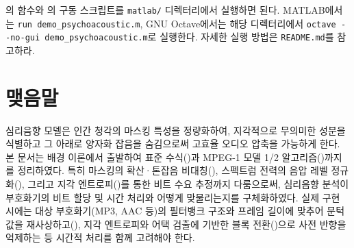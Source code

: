 \documentclass[11pt,a4paper]{article}
\begin{document}
의 함수와 의 구동 스크립트를
\texttt{matlab/} 디렉터리에서 실행하면 된다. MATLAB에서는
\texttt{run demo\_psychoacoustic.m}, GNU Octave에서는 해당 디렉터리에서
\texttt{octave -{}-no-gui demo\_psychoacoustic.m}로 실행한다. 자세한 실행 방법은
\texttt{README.md}를 참고하라.

\section{맺음말}
심리음향 모델은 인간 청각의 마스킹 특성을 정량화하여, 지각적으로 무의미한 성분을
식별하고 그 아래로 양자화 잡음을 숨김으로써 고효율 오디오 압축을 가능하게 한다.
본 문서는 배경 이론에서 출발하여 표준 수식()과 MPEG-1 모델 1/2
알고리즘()까지를 정리하였다. 특히 마스킹의 확산·톤잡음
비대칭(), 스펙트럼 전력의 음압 레벨 정규화(), 그리고
지각 엔트로피()를 통한 비트 수요 추정까지 다룸으로써, 심리음향
분석이 부호화기의 비트 할당 및 시간 처리와 어떻게 맞물리는지를 구체화하였다.
실제 구현 시에는 대상 부호화기(MP3, AAC 등)의 필터뱅크 구조와 프레임 길이에
맞추어 문턱값을 재사상하고(), 지각 엔트로피와 어택 검출에 기반한
블록 전환()으로 사전 반향을 억제하는 등 시간적 처리를 함께
고려해야 한다.
\end{document}
